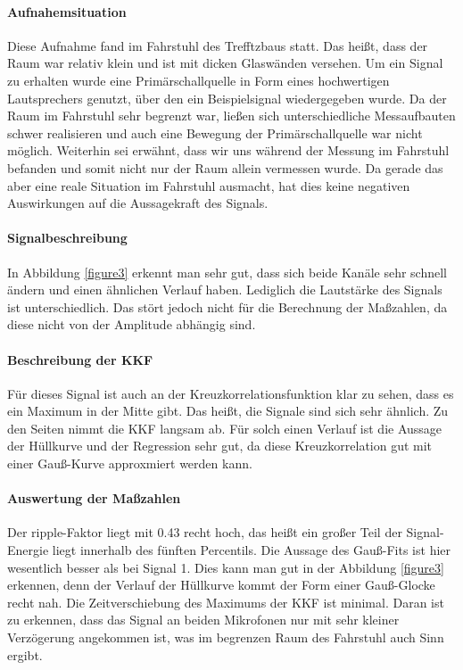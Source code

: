 \paragraph{Aufnahemsituation} Diese Aufnahme fand im Fahrstuhl des Trefftzbaus statt. Das heißt, dass der Raum war relativ klein und ist mit dicken Glaswänden versehen. Um ein Signal zu erhalten wurde eine Primärschallquelle in Form eines hochwertigen Lautsprechers genutzt, über den ein Beispielsignal wiedergegeben wurde. Da der Raum im Fahrstuhl sehr begrenzt war, ließen sich unterschiedliche Messaufbauten schwer realisieren und auch eine Bewegung der Primärschallquelle war nicht möglich. Weiterhin sei erwähnt, dass wir uns während der Messung im Fahrstuhl befanden und somit nicht nur der Raum allein vermessen wurde. Da gerade das aber eine reale Situation im Fahrstuhl ausmacht, hat dies keine negativen Auswirkungen auf die Aussagekraft des Signals. 
\paragraph{Signalbeschreibung}
In Abbildung \ref{figure3}  erkennt man sehr gut, dass sich beide Kanäle sehr schnell ändern und einen ähnlichen Verlauf haben. Lediglich die Lautstärke des Signals ist unterschiedlich. Das stört jedoch nicht für die Berechnung der Maßzahlen, da diese nicht von der Amplitude  abhängig sind. 
\paragraph{Beschreibung der KKF}
Für dieses Signal ist auch an der Kreuzkorrelationsfunktion klar zu sehen, dass es ein Maximum in der Mitte gibt. Das heißt, die Signale sind sich sehr ähnlich. Zu den Seiten nimmt die KKF langsam ab. Für solch einen Verlauf ist die Aussage der Hüllkurve und der Regression sehr gut, da diese Kreuzkorrelation gut mit einer Gauß-Kurve approxmiert werden kann.
\paragraph{Auswertung der Maßzahlen}
Der ripple-Faktor liegt mit 0.43 recht hoch, das heißt ein großer Teil der Signal-Energie liegt innerhalb des fünften Percentils. Die Aussage des Gauß-Fits ist hier wesentlich besser als bei Signal 1. Dies kann man gut in der Abbildung \ref{figure3} erkennen, denn der Verlauf der Hüllkurve kommt der Form einer Gauß-Glocke recht nah. Die Zeitverschiebung des Maximums der KKF ist minimal. Daran ist zu erkennen, dass das Signal an beiden Mikrofonen nur mit sehr kleiner Verzögerung angekommen ist, was im begrenzen Raum des Fahrstuhl auch Sinn ergibt.


